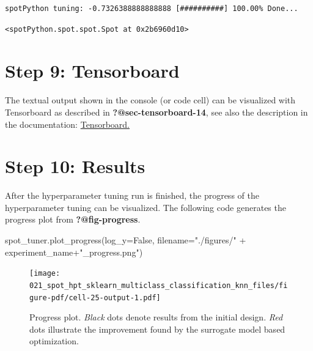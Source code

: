 \documentclass[
  letterpaper,
  DIV=11,
  numbers=noendperiod]{scrreprt}
\newenvironment{Shaded}{\begin{snugshade}}{\end{snugshade}}
\newcommand{\NormalTok}[1]{\textcolor[rgb]{0.00,0.23,0.31}{#1}}
\newcommand{\OperatorTok}[1]{\textcolor[rgb]{0.37,0.37,0.37}{#1}}
\newcommand{\StringTok}[1]{\textcolor[rgb]{0.13,0.47,0.30}{#1}}
\newcommand{\VariableTok}[1]{\textcolor[rgb]{0.07,0.07,0.07}{#1}}
\begin{document}
\begin{verbatim}
spotPython tuning: -0.7326388888888888 [##########] 100.00% Done...
\end{verbatim}

\begin{verbatim}
<spotPython.spot.spot.Spot at 0x2b6960d10>
\end{verbatim}

\hypertarget{sec-tensorboard-19}{%
\section{Step 9: Tensorboard}\label{sec-tensorboard-19}}

The textual output shown in the console (or code cell) can be visualized
with Tensorboard as described in \textbf{?@sec-tensorboard-14}, see also
the description in the documentation:
\href{https://sequential-parameter-optimization.github.io/spotPython/14_spot_ray_hpt_torch_cifar10.html\#sec-tensorboard-14}{Tensorboard.}

\hypertarget{sec-results-tuning-19}{%
\section{Step 10: Results}\label{sec-results-tuning-19}}

After the hyperparameter tuning run is finished, the progress of the
hyperparameter tuning can be visualized. The following code generates
the progress plot from \textbf{?@fig-progress}.

\begin{Shaded}
\begin{Highlighting}[]
\NormalTok{spot\_tuner.plot\_progress(log\_y}\OperatorTok{=}\VariableTok{False}\NormalTok{,}
\NormalTok{    filename}\OperatorTok{=}\StringTok{"./figures/"} \OperatorTok{+}\NormalTok{ experiment\_name}\OperatorTok{+}\StringTok{"\_progress.png"}\NormalTok{)}
\end{Highlighting}
\end{Shaded}

\begin{figure}[H]

{\centering \texttt{[image: 021\_spot\_hpt\_sklearn\_multiclass\_classification\_knn\_files/figure-pdf/cell-25-output-1.pdf]}

}

\caption{Progress plot. \emph{Black} dots denote results from the
initial design. \emph{Red} dots illustrate the improvement found by the
surrogate model based optimization.}

\end{figure}
\end{document}
